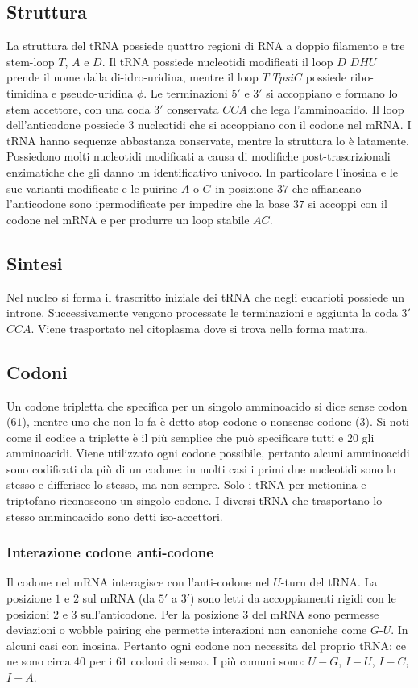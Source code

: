 \subsection{Struttura}
La struttura del tRNA possiede quattro regioni di RNA a doppio filamento e tre stem-loop $T$, $A$ e $D$. Il tRNA possiede nucleotidi modificati il loop $D$ $DHU$ prende il nome dalla di-idro-uridina, 
mentre il loop $T$ $TpsiC$ possiede ribo-timidina e pseudo-uridina $\phi$. Le terminazioni $5'$ e $3'$ si accoppiano e formano lo stem accettore, con una coda $3'$ conservata $CCA$ che lega l'amminoacido. 
Il loop dell'anticodone possiede $3$ nucleotidi che si accoppiano con il codone nel mRNA. I tRNA hanno sequenze abbastanza conservate, mentre la struttura lo \`e latamente. Possiedono molti nucleotidi 
modificati a causa di modifiche post-trascrizionali enzimatiche che gli danno un identificativo univoco. In particolare l'inosina e le sue varianti modificate e le puirine $A$ o $G$ in posizione $37$
che affiancano l'anticodone sono ipermodificate per impedire che la base $37$ si accoppi con il codone nel mRNA e per produrre un loop stabile $AC$. 
\subsection{Sintesi}
Nel nucleo si forma il trascritto iniziale dei tRNA che negli eucarioti possiede un introne. Successivamente vengono processate le terminazioni e aggiunta la coda $3'$ $CCA$. Viene trasportato nel 
citoplasma dove si trova nella forma matura. 
\subsection{Codoni}
Un codone tripletta che specifica per un singolo amminoacido si dice sense codon ($61$), mentre uno che non lo fa \`e detto stop codone o nonsense codone ($3$). Si noti come il codice a triplette \`e il
pi\`u semplice che pu\`o specificare tutti e $20$ gli amminoacidi. Viene utilizzato ogni codone possibile, pertanto alcuni amminoacidi sono codificati da pi\`u di un codone: in molti casi i primi due
nucleotidi sono lo stesso e differisce lo stesso, ma non sempre. Solo i tRNA per metionina e triptofano riconoscono un singolo codone. I diversi tRNA che trasportano lo stesso amminoacido sono
detti iso-accettori. 
\subsubsection{Interazione codone anti-codone}
Il codone nel mRNA interagisce con l'anti-codone nel $U$-turn del tRNA. La posizione $1$ e $2$ sul mRNA (da $5'$ a $3'$) sono letti da accoppiamenti rigidi con le posizioni $2$ e $3$ sull'anticodone. 
Per la posizione $3$ del mRNA sono permesse deviazioni o wobble pairing che permette interazioni non canoniche come $G$-$U$. In alcuni casi con inosina. Pertanto ogni codone non necessita del proprio tRNA:
ce ne sono circa $40$ per i $61$ codoni di senso. I pi\`u comuni sono: $U-G$, $I-U$, $I-C$, $I-A$. 
